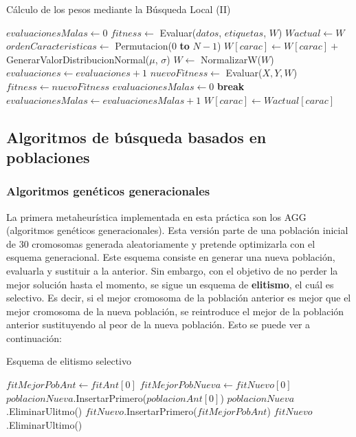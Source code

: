 \documentclass[11pt,a4paper]{article}
\begin{document}
\begin{algorithm}[H]
\caption{Cálculo de los pesos mediante la Búsqueda Local (II)}
\begin{algorithmic}
\State $evaluacionesMalas \gets 0$
\State $fitness \gets$ Evaluar($datos$, $etiquetas$, $W$)
\State $Wactual \gets W$
\State $ordenCaracteristicas \gets $ Permutacion(0 \textbf{to} $N - 1$)
	\State $W[carac] \gets W[carac] + $ GenerarValorDistribucionNormal($\mu$, $\sigma$)	
	\State $W \gets$ NormalizarW($W$)
	\State $evaluaciones \gets evaluaciones + 1$	
	\State $nuevoFitness \gets$ Evaluar($X, Y, W$)	
		\State $fitness \gets nuevoFitness$		
		\State $evaluacionesMalas \gets 0$		
		\State \textbf{break}
	\Else
		\State $evaluacionesMalas \gets evaluacionesMalas + 1$		
		\State $W[carac] \gets Wactual[carac]$		
	\EndIf	
		\State {}
	\EndIf
\EndFor
\EndWhile
\State {}
\EndFunction
\end{algorithmic}
\end{algorithm}

\newpage

\subsection{Algoritmos de búsqueda basados en poblaciones}

\subsubsection{Algoritmos genéticos generacionales}

La primera metaheurística implementada en esta práctica son los AGG (algoritmos genéticos generacionales). Esta versión parte
de una población inicial de 30 cromosomas generada aleatoriamente y pretende optimizarla con el esquema generacional. Este
esquema consiste en generar una nueva población, evaluarla y sustituir a la anterior. Sin embargo, con el objetivo de no perder
la mejor solución hasta el momento, se sigue un esquema de \textbf{elitismo}, el cuál es selectivo. Es decir, si el mejor
cromosoma de la población anterior es mejor que el mejor cromosoma de la nueva población, se reintroduce el mejor de la
población anterior sustituyendo al peor de la nueva población. Esto se puede ver a continuación:

\begin{algorithm}[H]
\caption{Esquema de elitismo selectivo}
\begin{algorithmic}[1]
\State $fitMejorPobAnt \gets fitAnt[0]$
\State $fitMejorPobNueva \gets fitNuevo[0]$
	\State $poblacionNueva$.InsertarPrimero($poblacionAnt[0]$)
	\State $poblacionNueva$.EliminarUlitmo()
	\State $fitNuevo$.InsertarPrimero($fitMejorPobAnt$)
	\State $fitNuevo$.EliminarUltimo()
\EndIf
\EndProcedure
\end{algorithmic}
\end{algorithm}
\end{document}
